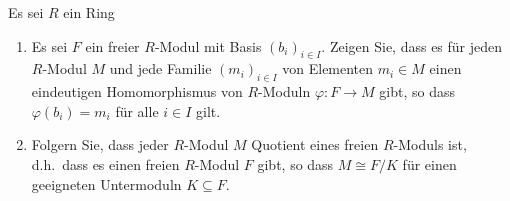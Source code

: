 \begin{question}
  \label{question: interaction of free modues with other modules}
  Es sei $R$ ein Ring
  \begin{enumerate}
    \item
      Es sei $F$ ein freier $R$-Modul mit Basis $(b_i)_{i \in I}$.
      Zeigen Sie, dass es für jeden $R$-Modul $M$ und jede Familie $(m_i)_{i \in I}$ von Elementen $m_i \in M$ einen eindeutigen Homomorphismus von $R$-Moduln $\varphi \colon F \to M$ gibt, so dass $\varphi(b_i) = m_i$ für alle $i \in I$ gilt.
    \item
      Folgern Sie, dass jeder $R$-Modul $M$ Quotient eines freien $R$-Moduls ist, d.h.\ dass es einen freien $R$-Modul $F$ gibt, so dass $M \cong F/K$ für einen geeigneten Untermoduln $K \subseteq F$.
  \end{enumerate}
\end{question}


